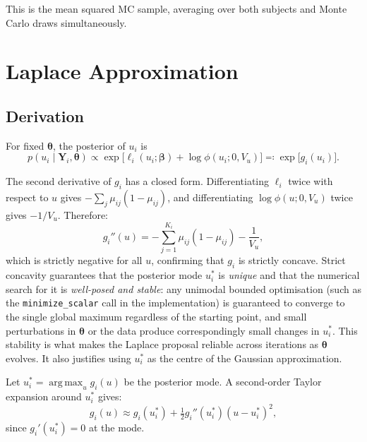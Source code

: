 \documentclass[11pt,a4paper]{article}
\theoremstyle{definition}
\theoremstyle{remark}
\newcommand{\bY}{\mathbf{Y}}
\newcommand{\bbeta}{\boldsymbol{\beta}}
\newcommand{\btheta}{\boldsymbol{\theta}}
\newcommand{\given}{\mid}
\DeclareMathOperator*{\argmax}{arg\,max}
\begin{document}
This is the mean squared MC sample, averaging over both subjects and Monte Carlo
draws simultaneously.

\section{Laplace Approximation}

\subsection{Derivation}

For fixed $\btheta$, the posterior of $u_i$ is
\begin{equation}
  p(u_i \given \bY_i, \btheta) \propto
    \exp\!\bigl[\ell_i(u_i;\bbeta) + \log\phi(u_i;0,V_u)\bigr]
    \eqqcolon \exp\bigl[g_i(u_i)\bigr].
\end{equation}

The second derivative of $g_i$ has a closed form.
Differentiating $\ell_i$ twice with respect to $u$ gives
$-\sum_j \mu_{ij}(1-\mu_{ij})$, and differentiating $\log\phi(u;0,V_u)$
twice gives $-1/V_u$.  Therefore:
\begin{equation}
  g_i''(u) = -\sum_{j=1}^{K_i} \mu_{ij}(1-\mu_{ij}) - \frac{1}{V_u},
  \label{eq:g2}
\end{equation}
which is strictly negative for all $u$, confirming that $g_i$ is strictly
concave.  Strict concavity guarantees that the posterior mode $u_i^*$ is
\emph{unique} and that the numerical search for it is \emph{well-posed and
stable}: any unimodal bounded optimisation (such as the \texttt{minimize\_scalar}
call in the implementation) is guaranteed to converge to the single global
maximum regardless of the starting point, and small perturbations in $\btheta$
or the data produce correspondingly small changes in $u_i^*$.  This stability
is what makes the Laplace proposal reliable across iterations as $\btheta$
evolves.  It also justifies using $u_i^*$ as the centre of the Gaussian
approximation.

Let $u_i^* = \argmax_{u} g_i(u)$ be the posterior mode.
A second-order Taylor expansion around $u_i^*$ gives:
\begin{equation}
  g_i(u) \approx g_i(u_i^*) + \tfrac{1}{2}g_i''(u_i^*)(u - u_i^*)^2,
  \label{eq:taylor}
\end{equation}
since $g_i'(u_i^*) = 0$ at the mode.
\end{document}
